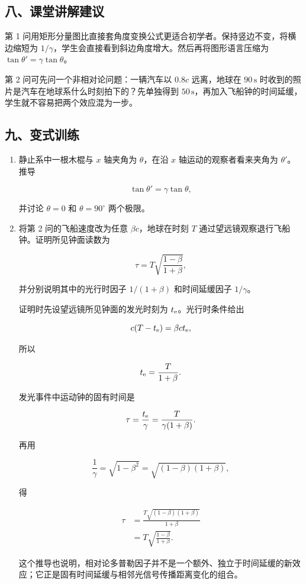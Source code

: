 \documentclass[12pt,a4paper,UTF8]{ctexart}
\begin{document}
\subsection{八、课堂讲解建议}\label{ux516bux8bfeux5802ux8bb2ux89e3ux5efaux8bae-7}

第 1
问用矩形分量图比直接套角度变换公式更适合初学者。保持竖边不变，将横边缩短为
\(1/\gamma\)，学生会直接看到斜边角度增大。然后再将图形语言压缩为
\(\tan\theta'=\gamma\tan\theta\)。

第 2 问可先问一个非相对论问题：一辆汽车以 \(0.8c\) 远离，地球在
\(90\,\mathrm s\) 时收到的照片是汽车在地球系什么时刻拍下的？先单独得到
\(50\,\mathrm s\)，再加入飞船钟的时间延缓，学生就不容易把两个效应混为一步。

\subsection{九、变式训练}\label{ux4e5dux53d8ux5f0fux8badux7ec3-7}

\begin{enumerate}
\def\labelenumi{\arabic{enumi}.}
\item
  静止系中一根木棍与 \(x\) 轴夹角为 \(\theta\)，在沿 \(x\)
  轴运动的观察者看来夹角为 \(\theta'\)。推导

  \[
  \tan\theta'=\gamma\tan\theta,
  \]

  并讨论 \(\theta=0\) 和 \(\theta=90^\circ\) 两个极限。
\item
  将第 2 问的飞船速度改为任意 \(\beta c\)，地球在时刻 \(T\)
  通过望远镜观察退行飞船钟。证明所见钟面读数为

  \[
  \tau=T\sqrt{\frac{1-\beta}{1+\beta}},
  \]

  并分别说明其中的光行时因子 \(1/(1+\beta)\) 和时间延缓因子
  \(1/\gamma\)。

  证明时先设望远镜所见钟面的发光时刻为 \(t_{\rm e}\)。光行时条件给出

  \[
  c(T-t_{\rm e})=\beta ct_{\rm e},
  \]

  所以

  \[
  t_{\rm e}=\frac{T}{1+\beta}.
  \]

  发光事件中运动钟的固有时间是

  \[
  \tau=\frac{t_{\rm e}}{\gamma}
  =\frac{T}{\gamma(1+\beta)}.
  \]

  再用

  \[
  \frac1\gamma=\sqrt{1-\beta^2}
  =\sqrt{(1-\beta)(1+\beta)},
  \]

  得

  \[
  \begin{aligned}
  \tau
  &=\frac{T\sqrt{(1-\beta)(1+\beta)}}{1+\beta}\\
  &=T\sqrt{\frac{1-\beta}{1+\beta}}.
  \end{aligned}
  \]

  这个推导也说明，相对论多普勒因子并不是一个额外、独立于时间延缓的新效应；它正是固有时间延缓与相邻光信号传播距离变化的组合。
\end{enumerate}
\end{document}
